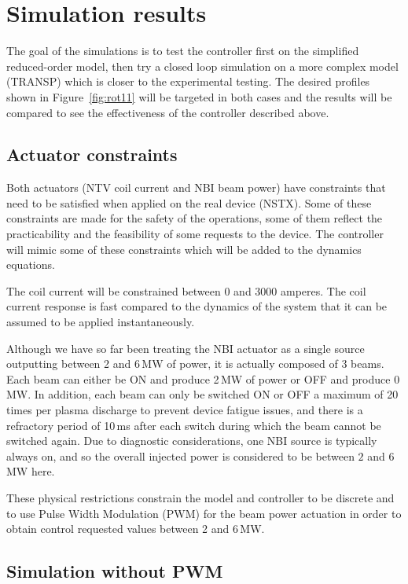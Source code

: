 \documentclass[12pt]{iopart}
\begin{document}
\section{Simulation results} 
The goal of the simulations is to test the controller first on the simplified reduced-order model, then try a closed loop simulation on a more complex model (TRANSP) which is closer to the experimental testing.  The desired profiles shown in Figure~\ref{fig:rot11} will be targeted in both cases and the results will be compared to see the effectiveness of the controller described above.

\subsection{Actuator constraints}
\label{constraints}

Both actuators (NTV coil current and NBI beam power) have constraints that need to be satisfied when applied on the real device (NSTX). Some of these constraints are made for the safety of the operations, some of them reflect the practicability and the feasibility of some requests to the device. The controller will mimic some of these constraints which will be added to the dynamics equations.

The coil current will be constrained between 0 and 3000 amperes.
The coil current response is fast compared to the dynamics of the system that it can be assumed to be applied instantaneously.

Although we have so far been treating the NBI actuator as a single source outputting between 2 and 6\,MW of power, it is actually composed of 3 beams. Each beam can either be ON and produce 2\,MW of power or OFF and produce 0\,MW.
In addition, each beam can only be switched ON or OFF a maximum of 20 times per plasma discharge to prevent device fatigue issues, and there is a refractory period of 10\,ms after each switch during which the beam cannot be switched again.
Due to diagnostic considerations, one NBI source is typically always on, and so the overall injected power is considered to be between $2$ and $6$ MW here.

These physical restrictions constrain the model and controller to be discrete and to use Pulse Width Modulation (PWM) for the beam power actuation in order to obtain control requested values between 2 and 6\,MW.


\subsection{Simulation without PWM}
\label{noPWM}
\end{document}
